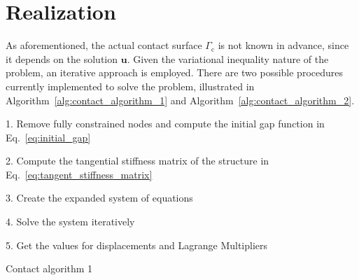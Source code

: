 \documentclass[10pt,a4paper]{article}
\begin{document}
\section{Realization}

As aforementioned, the actual contact surface $\Gamma_{\text{c}}$ is not known in advance, since it depends on the solution $\mathbf{u}$. Given the variational inequality nature of the problem, an iterative approach is employed. There are two possible procedures currently implemented to solve the problem, illustrated in Algorithm~\ref{alg:contact_algorithm_1} and Algorithm~\ref{alg:contact_algorithm_2}. \\

\begin{algorithm}[ht]

	1. Remove fully constrained nodes and compute the initial gap function in Eq.~\eqref{eq:initial_gap} \; \vspace*{5pt}
	
    2. Compute the tangential stiffness matrix of the structure in Eq.~\eqref{eq:tangent_stiffness_matrix} \;	\vspace*{5pt}
    
    3. Create the expanded system of equations \;	\vspace*{5pt}
    
    4. Solve the system iteratively \;	\vspace*{5pt}

	\vspace*{5pt}
	5. Get the values for displacements and Lagrange Multipliers \; \vspace*{5pt}

	\caption{Contact algorithm 1}
	
	\label{alg:contact_algorithm_1}
\end{algorithm}
\end{document}
